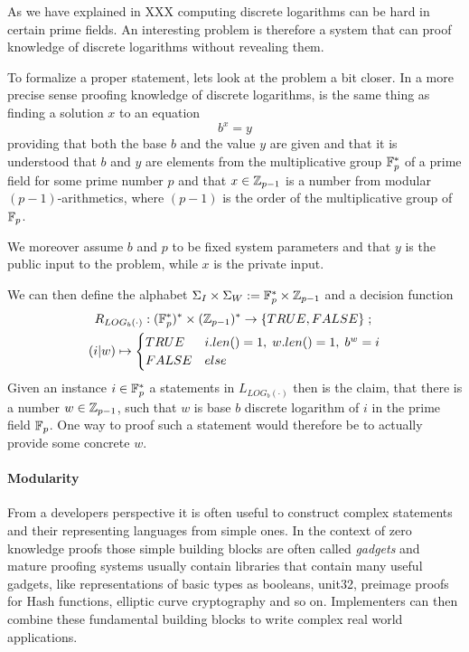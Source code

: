 \begin{example} As we have explained in XXX computing discrete logarithms can be hard in certain prime fields. An interesting problem is therefore a system that can proof knowledge of discrete logarithms without revealing them.

To formalize a proper statement, lets look at the problem a bit closer. In a more precise sense proofing knowledge of discrete logarithms, is the same thing as finding a solution $x$ to an equation
$$
b^x = y
$$ 
providing that both the base $b$ and the value $y$ are given and that it is understood that $b$ and $y$ are elements from the multiplicative group $\mathbb{F}_{p}^*$ of a prime field for some prime number $p$ and that $x\in \mathbb{Z}_{p-1}$ is a number from modular $(p-1)$-arithmetics, where $(p-1)$ is the order of the multiplicative group of $\mathbb{F}_p$.

We moreover assume $b$ and $p$ to be fixed system parameters and that $y$ is the public input to the problem, while $x$ is the private input. 

We can then define the alphabet $\Sigma_I \times \Sigma_W := \mathbb{F}_p^* \times \mathbb{Z}_{p-1}$ and a decision function
\begin{multline*}
R_{LOG_b(\cdot)} : (\mathbb{F}_p^*)^* \times (\mathbb{Z}_{p-1})^* \to \{TRUE, FALSE\}\;;\;\\
(i|w) \mapsto
\begin{cases}
TRUE & i.len()=1,\; w.len()=1,\; b^w = i\\
FALSE & else
\end{cases}
\end{multline*}
Given an instance $i\in \mathbb{F}_p^*$ a statements in $L_{LOG_b(\cdot)}$ then is the claim, that there is a number $w\in \mathbb{Z}_{p-1}$, such that $w$ is base $b$ discrete logarithm of $i$ in the prime field $\mathbb{F}_p$. One way to proof such a statement would therefore be to actually provide some concrete $w$. 
\end{example}
\paragraph{Modularity} From a developers perspective it is often useful to construct complex statements and their representing languages from simple ones. In the context of zero knowledge proofs those simple building blocks are often called \textit{gadgets} and mature proofing systems usually contain libraries that contain many useful gadgets, like representations of basic types as booleans, unit32, preimage proofs for Hash functions, elliptic curve cryptography and so on. Implementers can then combine these fundamental building blocks to write complex real world applications. 


